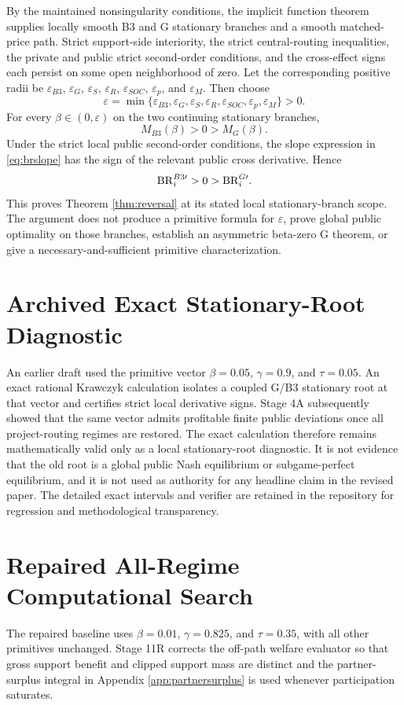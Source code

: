 By the maintained nonsingularity conditions, the implicit function theorem supplies locally smooth B3 and G stationary branches and a smooth matched-price path. Strict support-side interiority, the strict central-routing inequalities, the private and public strict second-order conditions, and the cross-effect signs each persist on some open neighborhood of zero. Let the corresponding positive radii be $\varepsilon_{B3}$, $\varepsilon_G$, $\varepsilon_{S}$, $\varepsilon_R$, $\varepsilon_{SOC}$, $\varepsilon_p$, and $\varepsilon_M$. Then choose
\[
\varepsilon
=\min\{\varepsilon_{B3},\varepsilon_G,\varepsilon_S,\varepsilon_R,
\varepsilon_{SOC},\varepsilon_p,\varepsilon_M\}>0.
\]
For every $\beta\in(0,\varepsilon)$ on the two continuing stationary branches,
\[
M_{B3}(\beta)>0>M_G(\beta).
\]
Under the strict local public second-order conditions, the slope expression in \eqref{eq:brslope} has the sign of the relevant public cross derivative. Hence
\[
\mathrm{BR}_i^{B3\prime}>0>\mathrm{BR}_i^{G\prime}.
\]
This proves Theorem \ref{thm:reversal} at its stated local stationary-branch scope. The argument does not produce a primitive formula for $\varepsilon$, prove global public optimality on those branches, establish an asymmetric beta-zero G theorem, or give a necessary-and-sufficient primitive characterization.

\section{Archived Exact Stationary-Root Diagnostic}\label{app:archivedexact}
An earlier draft used the primitive vector $\beta=0.05$, $\gamma=0.9$, and $\tau=0.05$. An exact rational Krawczyk calculation isolates a coupled G/B3 stationary root at that vector and certifies strict local derivative signs. Stage 4A subsequently showed that the same vector admits profitable finite public deviations once all project-routing regimes are restored. The exact calculation therefore remains mathematically valid only as a local stationary-root diagnostic. It is not evidence that the old root is a global public Nash equilibrium or subgame-perfect equilibrium, and it is not used as authority for any headline claim in the revised paper. The detailed exact intervals and verifier are retained in the repository for regression and methodological transparency.

\section{Repaired All-Regime Computational Search}\label{app:numerics}
The repaired baseline uses $\beta=0.01$, $\gamma=0.825$, and $\tau=0.35$, with all other primitives unchanged. Stage 11R corrects the off-path welfare evaluator so that gross support benefit and clipped support mass are distinct and the partner-surplus integral in Appendix \ref{app:partnersurplus} is used whenever participation saturates.

